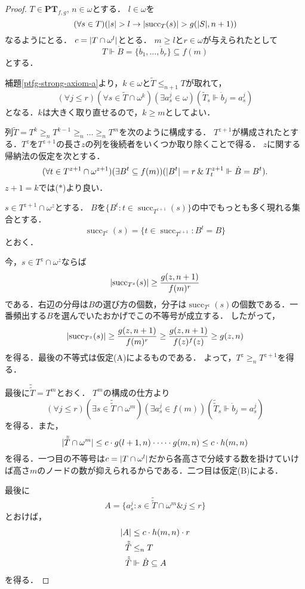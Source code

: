 \documentclass[uplatex]{jsarticle}
\newcommand\forces{\Vdash}
\newcommand{\suc}{\operatorname{succ}}
\newcommand{\PTfg}{\mathbf{PT}_{f,g}}
\newcommand{\AND}{\mathbin{\&}}
\DeclarePairedDelimiter\abs{\lvert}{\rvert}
\renewcommand\subset{\subseteq}
\theoremstyle{definition}
\begin{document}
	\begin{proof}
		$T \in \PTfg$, $n \in \omega$とする．
		$l \in \omega$を
		\[
		(\forall s \in T)(|s| > l \rightarrow \abs{\suc_T(s)} > g(\abs{S}, n+1))
		\]
		なるようにとる．
		$c = \abs{T \cap \omega^l}$ととる．
		$m \ge l$と$r \in \omega$が与えられたとして
		\[
		T \forces \dot{B} = \{\dot{b}_1, \dots, \dot{b}_r\} \subset f(m)
		\]
		とする．
		
		補題\ref{ptfg-strong-axiom-a}より，$k \in \omega$と$\tilde{T} \le_{n+1} T$が取れて，
		\[
		(\forall j \le  r)(\forall s \in \tilde{T} \cap \omega^k)(\exists a^j_s \in \omega)(\tilde{T}_s \forces \dot{b}_j = a^j_s) \tag{$\ast$}
		\]
		となる．$k$は大きく取り直せるので，$k \ge m$としてよい．
		
		列$\tilde{T} = T^k \ge_n T^{k-1} \ge_n \dots \ge_n T^m$を次のように構成する．
		$T^{z+1}$が構成されたとする．$T^z$を$T^{z+1}$の長さ$z$の列を後続者をいくつか取り除くことで得る．
		$z$に関する帰納法の仮定を次とする．
		\[
		(\forall t \in T^{z+1} \cap \omega^{z+1})(\exists B^t \subset f(m))(\abs{B^t} = r \AND T^{z+1}_t \forces \dot{B} = B^t).
		\]
		$z+1 = k$では($\ast$)より良い．
		
		$s \in T^{z+1} \cap \omega^z$とする．
		$B$を$\{ B^t : t \in \suc_{T^{z+1}}(s)\}$の中でもっとも多く現れる集合とする．
		\[
		\suc_{T^z}(s) = \{ t \in \suc_{T^{z+1}} : B^t = B \}
		\]
		とおく．
		
		今，$s \in T^z \cap \omega^z$ならば
		\[
		\abs{\suc_{T^z}(s)} \ge \frac{g(z, n+1)}{f(m)^r}
		\]
		である．右辺の分母は$B$の選び方の個数，分子は$\suc_{T^z}(s)$の個数である．一番頻出する$B$を選んでいたおかげでこの不等号が成立する．
		したがって，	
		\[
		\abs{\suc_{T^z}(s)} \ge \frac{g(z, n+1)}{f(m)^r} \ge \frac{g(z, n+1)}{f(z)^f(z)} \ge g(z, n)
		\]
		を得る．最後の不等式は仮定(A)によるものである．
		よって，$T^z \ge_n T^{z+1}$を得る．
		
		最後に$\tilde{\tilde{T}} = T^m$とおく．
		$T^m$の構成の仕方より
		\[
		(\forall j \le r)(\exists s \in \tilde{\tilde{T}} \cap \omega^m)(\exists a^j_s \in f(m))(\tilde{\tilde{T}}_s \forces \dot{b}_j = a^j_s)
		\]
		を得る．また，
		\[
		\abs{\tilde{\tilde{T}} \cap \omega^m} \le c \cdot g(l+1, n) \cdot \dots \cdot g(m, n) \le c \cdot h(m, n)
		\]
		を得る．一つ目の不等号は$c = \abs{T \cap \omega^l}$だから各高さで分岐する数を掛けていけば高さ$m$のノードの数が抑えられるからである．二つ目は仮定(B)による．
		
		最後に
		\[ A = \{a^j_s  : s \in \tilde{\tilde{T}} \cap \omega^m \AND j \le r \} \]
		とおけば，
		\begin{align*}
		\abs{A} &\le c \cdot h(m, n) \cdot r \\
		\tilde{\tilde{T}} &\le_n T \\
		\tilde{\tilde{T}} &\forces \dot{B} \subset A
		\end{align*}
		を得る．
	\end{proof}
\end{document}

